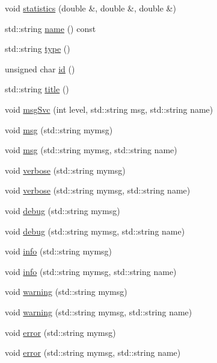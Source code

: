 \begin{DoxyCompactItemize}
\item 
void \hyperlink{classHisto1D_acc0d6f2080b0cfafc85ebc49cf0efc31}{statistics} (double \&, double \&, double \&)
\item 
std::string \hyperlink{classObject_a975e888d50bfcbffda2c86368332a5cd}{name} () const 
\item 
std::string \hyperlink{classObject_a84f99f70f144a83e1582d1d0f84e4e62}{type} ()
\item 
unsigned char \hyperlink{classObject_af99145335cc61ff6e2798ea17db009d2}{id} ()
\item 
std::string \hyperlink{classObject_a73a0f1a41828fdd8303dd662446fb6c3}{title} ()
\item 
void \hyperlink{classObject_a3f9d5537ebce0c0f2bf6ae4d92426f3c}{msgSvc} (int level, std::string msg, std::string name)
\item 
void \hyperlink{classObject_a58b2d0618c2d08cf2383012611528d97}{msg} (std::string mymsg)
\item 
void \hyperlink{classObject_ac5d59299273cee27aacf7de00d2e7034}{msg} (std::string mymsg, std::string name)
\item 
void \hyperlink{classObject_a83d2db2df682907ea1115ad721c1c4a1}{verbose} (std::string mymsg)
\item 
void \hyperlink{classObject_a2d4120195317e2a3c6532e8bb9f3da68}{verbose} (std::string mymsg, std::string name)
\item 
void \hyperlink{classObject_aac010553f022165573714b7014a15f0d}{debug} (std::string mymsg)
\item 
void \hyperlink{classObject_a6c9a0397ca804e04d675ed05683f5420}{debug} (std::string mymsg, std::string name)
\item 
void \hyperlink{classObject_a644fd329ea4cb85f54fa6846484b84a8}{info} (std::string mymsg)
\item 
void \hyperlink{classObject_a1ca123253dfd30fc28b156f521dcbdae}{info} (std::string mymsg, std::string name)
\item 
void \hyperlink{classObject_a65cd4fda577711660821fd2cd5a3b4c9}{warning} (std::string mymsg)
\item 
void \hyperlink{classObject_a11f101db4dd73d9391b0231818881d86}{warning} (std::string mymsg, std::string name)
\item 
void \hyperlink{classObject_a204a95f57818c0f811933917a30eff45}{error} (std::string mymsg)
\item 
void \hyperlink{classObject_ad7f6c457733082efa2f9ff5f5c8e119a}{error} (std::string mymsg, std::string name)
\item 

\end{DoxyCompactItemize}
